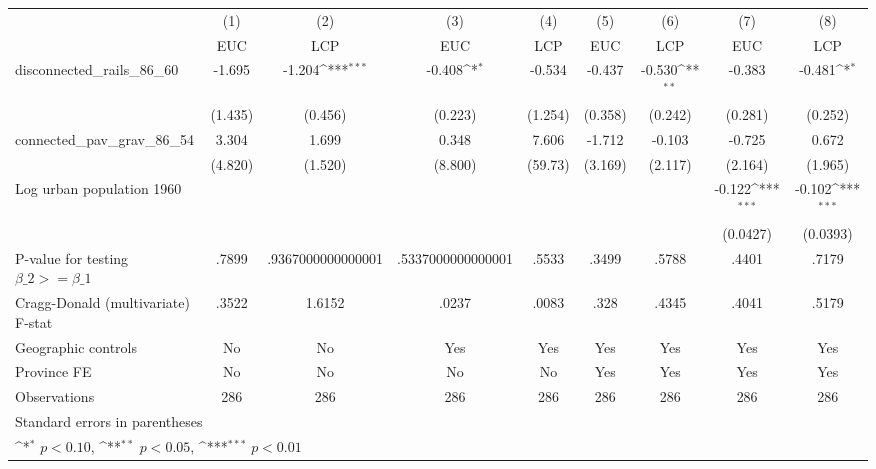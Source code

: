 {
\def\sym#1{\ifmmode^{#1}\else\(^{#1}\)\fi}
\begin{tabular}{l*{8}{c}}
\hline\hline
                &\multicolumn{1}{c}{(1)}&\multicolumn{1}{c}{(2)}&\multicolumn{1}{c}{(3)}&\multicolumn{1}{c}{(4)}&\multicolumn{1}{c}{(5)}&\multicolumn{1}{c}{(6)}&\multicolumn{1}{c}{(7)}&\multicolumn{1}{c}{(8)}\\
                &\multicolumn{1}{c}{EUC}&\multicolumn{1}{c}{LCP}&\multicolumn{1}{c}{EUC}&\multicolumn{1}{c}{LCP}&\multicolumn{1}{c}{EUC}&\multicolumn{1}{c}{LCP}&\multicolumn{1}{c}{EUC}&\multicolumn{1}{c}{LCP}\\
\hline
disconnected\_rails\_86\_60&   -1.695         &   -1.204\sym{***}&   -0.408\sym{*}  &   -0.534         &   -0.437         &   -0.530\sym{**} &   -0.383         &   -0.481\sym{*}  \\
                &  (1.435)         &  (0.456)         &  (0.223)         &  (1.254)         &  (0.358)         &  (0.242)         &  (0.281)         &  (0.252)         \\
[1em]
connected\_pav\_grav\_86\_54&    3.304         &    1.699         &    0.348         &    7.606         &   -1.712         &   -0.103         &   -0.725         &    0.672         \\
                &  (4.820)         &  (1.520)         &  (8.800)         &  (59.73)         &  (3.169)         &  (2.117)         &  (2.164)         &  (1.965)         \\
[1em]
Log urban population 1960&                  &                  &                  &                  &                  &                  &   -0.122\sym{***}&   -0.102\sym{***}\\
                &                  &                  &                  &                  &                  &                  & (0.0427)         & (0.0393)         \\
\hline
P-value for testing $\beta\_{2} >= \beta\_{1}$&    .7899         &.9367000000000001         &.5337000000000001         &    .5533         &    .3499         &    .5788         &    .4401         &    .7179         \\
Cragg-Donald (multivariate) F-stat&    .3522         &   1.6152         &    .0237         &    .0083         &     .328         &    .4345         &    .4041         &    .5179         \\
Geographic controls&       No         &       No         &      Yes         &      Yes         &      Yes         &      Yes         &      Yes         &      Yes         \\
Province FE     &       No         &       No         &       No         &       No         &      Yes         &      Yes         &      Yes         &      Yes         \\
Observations    &      286         &      286         &      286         &      286         &      286         &      286         &      286         &      286         \\
\hline\hline
\multicolumn{9}{l}{\footnotesize Standard errors in parentheses}\\
\multicolumn{9}{l}{\footnotesize \sym{*} \(p<0.10\), \sym{**} \(p<0.05\), \sym{***} \(p<0.01\)}\\
\end{tabular}
}

